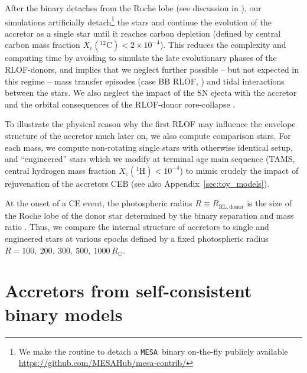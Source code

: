 \documentclass[twocolumn,twocolappendix,trackchanges]{aastex63}
\newcommand{\code}[1]{\texttt{#1}}
\newcommand{\mesa}{\code{MESA}}
\begin{document}
 After the binary detaches from the Roche lobe (see discussion in
 \citealt{renzo:2021zoph}), our simulations artificially
 detach\footnote{We make the routine to detach a \mesa\ binary
   on-the-fly publicly available
   \url{https://github.com/MESAHub/mesa-contrib/}} the stars and
 continue the evolution of the accretor as a single star until it
 reaches carbon depletion (defined by central carbon mass fraction
 $X_\mathrm{c}(^{12}\mathrm{C})<2\times10^{-4} $). This reduces the
 complexity and computing time by avoiding to simulate the late
 evolutionary phases of the RLOF-donors, and implies that we neglect
 further possible -- but not expected in this regime -- mass
 transfer episodes (case BB RLOF, \citealt{delgado:81, laplace:2020}) and tidal
 interactions between the stars. We also neglect the impact of the SN
 ejecta with the accretor \cite[e.g.,][]{hirai:2018, ogata:2021} and
 the orbital consequences of the RLOF-donor core-collapse
 \citep[e.g.,][]{brandt:1995, kalogera:1996, tauris:1998,
   renzo:2019walk}.

 To illustrate the physical reason why the first RLOF may influence
 the envelope structure of the accretor much later on, we also compute
 comparison stars. For each mass, we compute non-rotating single stars
 with otherwise identical setup, and ``engineered'' stars which we
 modify at terminal age main sequence (TAMS, central hydrogen mass
 fraction $X_\mathrm{c}(^1\mathrm{H})<10^{-4}$) to mimic crudely the
 impact of rejuvenation of the accretors CEB (see also
 Appendix~\ref{sec:toy_models}).

 At the onset of a CE event, the photospheric radius
 $R\equiv R_\mathrm{RL, donor}$ is the size of the Roche lobe of the
 donor star determined by the binary separation and mass ratio
 \citep[e.g.,][]{paczynski:1971, eggleton:83}. Thus, we compare the
 internal structure of accretors to single and engineered stars at
 various epochs defined by a fixed photospheric
 radius $R=100,\ 200,\ 300,\ 500,\ 1000\,R_\odot$.

\section{Accretors from self-consistent binary models}
\label{sec:bin_models}
\end{document}
